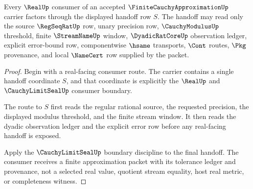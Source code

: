 \begin{theorem}
\label{thm:finite-cauchy-approximation-real-handoff}
Every $\RealUp$ consumer of an accepted $\FiniteCauchyApproximationUp$ carrier factors through the displayed handoff row $S$. The handoff may read only the source $\RegSeqRatUp$ row, unary precision row, $\CauchyModulusUp$ threshold, finite $\StreamNameUp$ window, $\DyadicRatCoreUp$ observation ledger, explicit error-bound row, componentwise $\hsame$ transports, $\Cont$ routes, $\Pkg$ provenance, and local $\NameCert$ row supplied by the packet.
\end{theorem}
\begin{proof}
Begin with a real-facing consumer route. The carrier contains a single handoff coordinate $S$, and that coordinate is explicitly the $\RealUp$ and $\CauchyLimitSealUp$ consumer boundary.

The route to $S$ first reads the regular rational source, the requested precision, the displayed modulus threshold, and the finite stream window. It then reads the dyadic observation ledger and the explicit error row before any real-facing handoff is exposed.

Apply the $\CauchyLimitSealUp$ boundary discipline to the final handoff. The consumer receives a finite approximation packet with its tolerance ledger and provenance, not a selected real value, quotient stream equality, host real metric, or completeness witness.
\end{proof}

